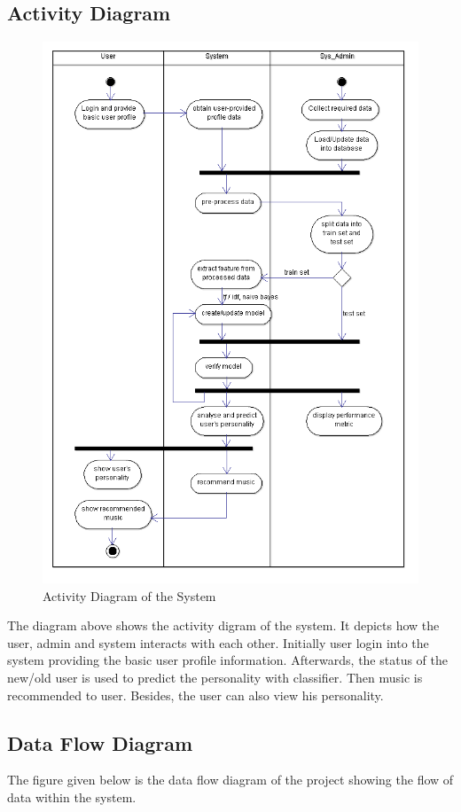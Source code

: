 \subsection{Activity Diagram}
\begin{figure}[!ht]
\centering
\includegraphics[width = 12 cm]{fig/Activity.png}
\caption{Activity Diagram of the System}
\label{fig:activity}
\end{figure}
The diagram above shows the activity digram of the system. It depicts how the user, admin and system interacts with each other. Initially user login into the system providing the basic user profile information. Afterwards, the status of the new/old user is used to predict the personality with classifier. Then music is recommended to user. Besides, the user can also view his personality.

\newpage
\subsection{Data Flow Diagram}
The figure given below is the data flow diagram of the project showing the flow of data within the system.


